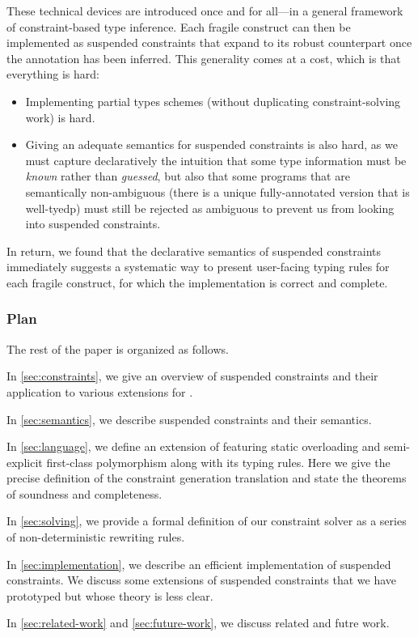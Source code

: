 \documentclass[acmsmall,screen,nonacm]{acmart}
\begin{document}
These technical devices are introduced once and for all---in a general
framework of constraint-based type inference. Each fragile \ML construct can
then be implemented as suspended constraints that expand to its robust
counterpart once the annotation has been inferred. This generality comes at
a cost, which is that everything is hard:
\begin{itemize}
\item Implementing partial types schemes (without duplicating
  constraint-solving work) is hard.
\item Giving an adequate semantics for suspended constraints is also hard, as we
  must capture declaratively the intuition that some type information must be
  \emph{known} rather than \emph{guessed}, but also that some programs
  that are semantically non-ambiguous (there is a unique fully-annotated
  version that is well-tyedp) must still be rejected as ambiguous to prevent
  us from looking into suspended constraints.
\end{itemize}
In return, we found that the declarative semantics of suspended constraints
immediately suggests a systematic way to present user-facing typing rules
for each fragile construct, for which the implementation is correct and
complete.

\subsubsection* {Plan}

The rest of the paper is organized as follows.
\begin{enumerate*}[label={}]
\item
  In \cref{sec:constraints}, we give an overview of suspended constraints
  and their application to various extensions for \ML.
\item
  In \cref{sec:semantics}, we describe suspended constraints and their semantics.
\item
  In \cref{sec:language}, we define an extension of \ML featuring static
  overloading and semi-explicit first-class polymorphism along with its
  typing rules. Here we give the precise definition of the constraint
  generation translation and state the theorems of soundness and
  completeness.
\item
  In \cref{sec:solving}, we provide a formal definition of our constraint
  solver as a series of non-deterministic rewriting rules.
\item In \cref{sec:implementation}, we describe an efficient implementation
  of suspended constraints. We discuss some extensions of suspended
  constraints that we have prototyped but whose theory is less clear.
\item
  In \cref{sec:related-work} and \cref{sec:future-work}, we discuss related
  and futre work.
\end{enumerate*}
\end{document}
